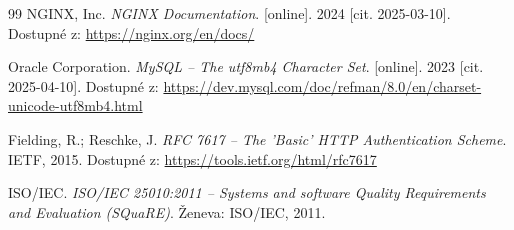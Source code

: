 \documentclass[12pt,a4paper]{report}
\begin{document}
\begin{thebibliography}{99}
NGINX, Inc.
\textit{NGINX Documentation}.
[online]. 2024 [cit. 2025-03-10].
Dostupné z: \url{https://nginx.org/en/docs/}

Oracle Corporation.
\textit{MySQL -- The utf8mb4 Character Set}.
[online]. 2023 [cit. 2025-04-10].
Dostupné z: \url{https://dev.mysql.com/doc/refman/8.0/en/charset-unicode-utf8mb4.html}

Fielding, R.; Reschke, J.
\textit{RFC 7617 -- The 'Basic' HTTP Authentication Scheme}.
IETF, 2015.
Dostupné z: \url{https://tools.ietf.org/html/rfc7617}

ISO/IEC.
\textit{ISO/IEC 25010:2011 -- Systems and software Quality Requirements and Evaluation (SQuaRE)}.
Ženeva: ISO/IEC, 2011.

\end{thebibliography}
\end{document}
